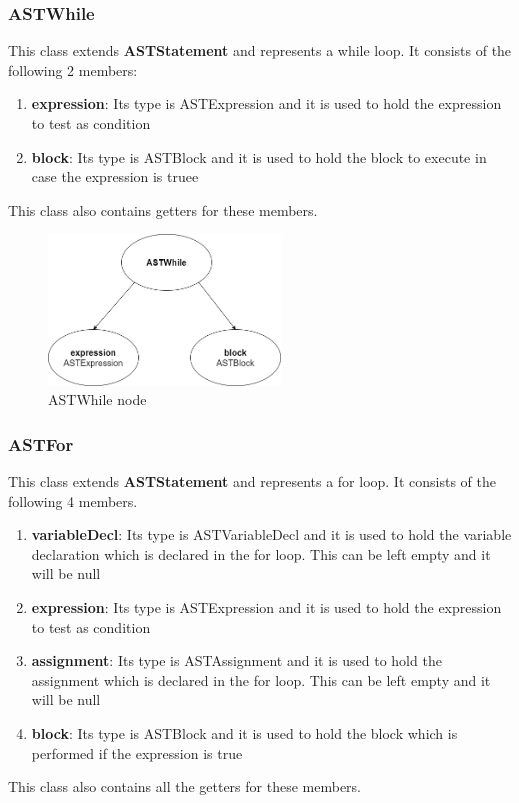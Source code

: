 \documentclass{article}
\begin{document}
						\subsubsection{ASTWhile}
					
					This class extends \textbf{ASTStatement} and represents a while loop. It consists of the following 2 members:
					
					\begin{enumerate}
					\item \textbf{expression}: Its type is ASTExpression and it is used to hold the expression to test as condition
					\item \textbf{block}: Its type is ASTBlock and it is used to hold the block to execute in case the expression is truee
					\end{enumerate}	
					
					 This class also contains getters for these members.	
					 
					 		\begin{figure}[H]
					\centering
			 			\includegraphics[width=0.55\textwidth]{astwhile.png}
			  			\caption{{ASTWhile} node}
			  			\label{fig:astwhile}
					\end{figure}	 	
				
						\subsubsection{ASTFor}
					
					This class extends \textbf{ASTStatement} and represents a for loop. It consists of the following 4 members.
					\begin{enumerate}
					\item \textbf{variableDecl}: Its type is ASTVariableDecl and it is used to hold the variable declaration which is declared in the for loop. This can be left empty and it will be null
					\item \textbf{expression}: Its type is ASTExpression and it is used to hold the expression to test as condition
					\item \textbf{assignment}: Its type is ASTAssignment and it is used to hold the assignment which is declared in the for loop. This can be left empty and it will be null
					\item \textbf{block}: Its type is ASTBlock and it is used to hold the block which is performed if the expression is true
				
					\end{enumerate}
					This class also contains all the getters for these members.
					
\end{document}
